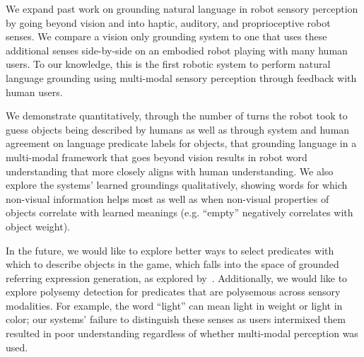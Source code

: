 We expand past work on grounding natural language in robot sensory perception by going beyond vision and into haptic, auditory, and proprioceptive robot senses.
We compare a vision only grounding system to one that uses these additional senses side-by-side on an embodied robot playing \ispy with many human users.
To our knowledge, this is the first robotic system to perform natural language grounding using multi-modal sensory perception through feedback with human users.

We demonstrate quantitatively, through the number of turns the robot took to guess objects being described by humans as well as through system and human agreement on language predicate labels for objects, that grounding language in a multi-modal framework that goes beyond vision results in robot word understanding that more closely aligns with human understanding.
We also explore the systems' learned groundings qualitatively, showing words for which non-visual information helps most as well as when non-visual properties of objects correlate with learned meanings (e.g. ``empty'' negatively correlates with object weight).

In the future, we would like to explore better ways to select predicates with which to describe objects in the \ispy game, which falls into the space of grounded referring expression generation, as explored by~\cite{tellex:rss14}.
Additionally, we would like to explore polysemy detection for predicates that are polysemous across sensory modalities.
For example, the word ``light'' can mean light in weight or light in color; our systems' failure to distinguish these senses as users intermixed them resulted in poor understanding regardless of whether multi-modal perception was used.